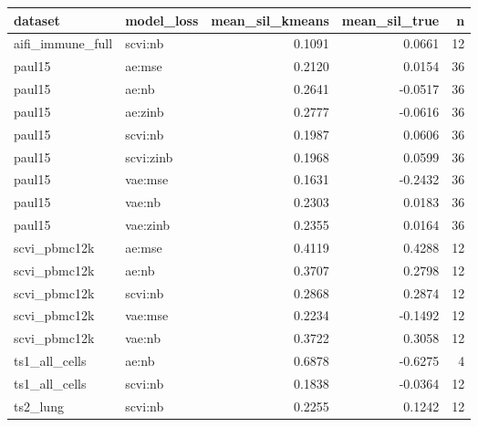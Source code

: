 \begin{tabular}{llrrr}
\toprule
dataset & model\_loss & mean\_sil\_kmeans & mean\_sil\_true & n \\
\midrule
aifi\_immune\_full & scvi:nb & 0.1091 & 0.0661 & 12 \\
paul15 & ae:mse & 0.2120 & 0.0154 & 36 \\
paul15 & ae:nb & 0.2641 & -0.0517 & 36 \\
paul15 & ae:zinb & 0.2777 & -0.0616 & 36 \\
paul15 & scvi:nb & 0.1987 & 0.0606 & 36 \\
paul15 & scvi:zinb & 0.1968 & 0.0599 & 36 \\
paul15 & vae:mse & 0.1631 & -0.2432 & 36 \\
paul15 & vae:nb & 0.2303 & 0.0183 & 36 \\
paul15 & vae:zinb & 0.2355 & 0.0164 & 36 \\
scvi\_pbmc12k & ae:mse & 0.4119 & 0.4288 & 12 \\
scvi\_pbmc12k & ae:nb & 0.3707 & 0.2798 & 12 \\
scvi\_pbmc12k & scvi:nb & 0.2868 & 0.2874 & 12 \\
scvi\_pbmc12k & vae:mse & 0.2234 & -0.1492 & 12 \\
scvi\_pbmc12k & vae:nb & 0.3722 & 0.3058 & 12 \\
ts1\_all\_cells & ae:nb & 0.6878 & -0.6275 & 4 \\
ts1\_all\_cells & scvi:nb & 0.1838 & -0.0364 & 12 \\
ts2\_lung & scvi:nb & 0.2255 & 0.1242 & 12 \\
\bottomrule
\end{tabular}

